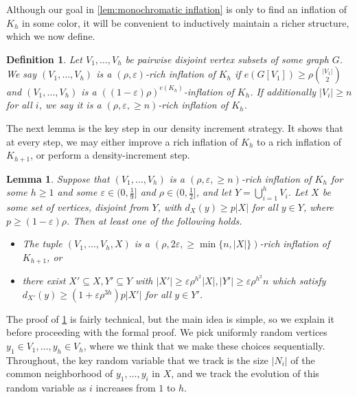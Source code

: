 \documentclass{aic}
\theoremstyle{plain}
\newtheorem{lemma}[theorem]{Lemma}
\newtheorem{definition}[theorem]{Definition}
\theoremstyle{remark}
\newcommand{\eps}{\ensuremath{\varepsilon}}
\newcommand\ab[1]{\lvert #1 \rvert}
\begin{document}
Although our goal in \cref{lem:monochromatic inflation} is only to find an inflation of $K_h$ in some color, it will be convenient to inductively maintain a richer structure, which we now define.
\begin{definition}
    Let $V_1,\dots,V_h$ be pairwise disjoint vertex subsets of some graph $G$.
    We say $(V_1,\dots,V_h)$ is a $(\rho,\eps)$-rich inflation of $K_h$ if $e(G[V_1])\ge \rho \binom{|V_1|}{2}$ and $(V_1,\dots,V_h)$ is a $((1-\eps)\rho)^{e(K_h)}$-inflation of $K_h$. If additionally $\ab{V_i}\geq n$ for all $i$, we say it is a $(\rho,\eps,\geq n)$-rich inflation of $K_h$.
\end{definition}
The next lemma is the key step in our density increment strategy. It shows that at every step, we may either improve a rich inflation of $K_h$ to a rich inflation of $K_{h+1}$, or perform a density-increment step.




\begin{lemma}\label{lem: rich increment}
    Suppose that $(V_1,\dots,V_h)$ is a $(\rho,\eps,\geq n)$-rich inflation of $K_h$ for some $h \geq 1$ and some $\eps \in (0,\frac 19]$ and $\rho \in (0,\frac 12]$, and let $Y = \bigcup_{i=1}^h V_i$. Let $X$ be some set of vertices, disjoint from $Y$, with  $d_X(y)\ge p|X|$ for all $y\in Y$, where $p \geq (1-\eps)\rho$. Then at least one of the following holds.
    \begin{itemize}
        \item The tuple $(V_1,\dots,V_h,X)$ is a $(\rho,2\eps,\geq \min\{n,\ab X\})$-rich inflation of $K_{h+1}$, or
        \item there exist $X' \subseteq X, Y' \subseteq Y$ with $|X'|\ge \eps \rho^{h^2}|X|,|Y'|\ge \eps \rho^{h^2} n$ which satisfy $d_{X'}(y)\ge (1+\eps \rho^{3h})p|X'|$ for all $y\in Y'$.
    \end{itemize}
\end{lemma}
The proof of \cref{lem: rich increment} is fairly technical, but the main idea is simple, so we explain it before proceeding with the formal proof. We pick uniformly random vertices $y_1 \in V_1,\dots,y_h \in V_h$, where we think that we make these choices sequentially. Throughout, the key random variable that we track is the size $\ab{N_i}$ of the common neighborhood of $y_1,\dots,y_i$ in $X$, and we track the evolution of this random variable as $i$ increases from $1$ to $h$. 
\end{document}
